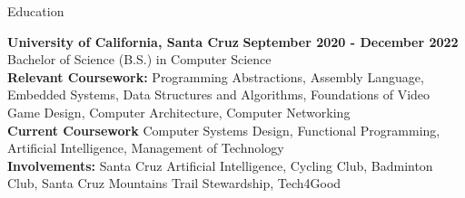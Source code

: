 \documentclass{resume}
\begin{document}
\begin{rSection}{\large Education}

{\bf University of California, Santa Cruz} \hfill {\bf{September 2020 - December 2022}}
\\ Bachelor of Science (B.S.) in Computer Science\hfill %
\\ \textbf{Relevant Coursework:} Programming Abstractions, Assembly Language, Embedded Systems, Data Structures and Algorithms, Foundations of Video Game Design, Computer Architecture, Computer Networking
\\ \textbf{Current Coursework} Computer Systems Design, Functional Programming, Artificial Intelligence, Management of Technology 
\\ \textbf{Involvements:}  Santa Cruz Artificial Intelligence, Cycling Club, Badminton Club, Santa Cruz Mountains Trail Stewardship, Tech4Good 

\end{rSection}
\end{document}

